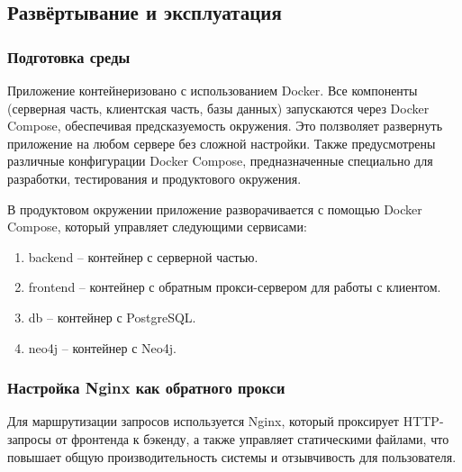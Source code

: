 


\subsection{Развёртывание и эксплуатация}

\subsubsection{Подготовка среды}

Приложение контейнеризовано с использованием Docker. Все компоненты (серверная часть, клиентская часть, базы данных) запускаются через Docker Compose, обеспечивая предсказуемость окружения. Это ползволяет развернуть приложение на любом сервере без сложной настройки. Также предусмотрены различные конфигурации Docker Compose, предназначенные специально для разработки, тестирования и продуктового окружения.

В продуктовом окружении приложение разворачивается с помощью Docker Compose, который управляет следующими сервисами:
\begin{enumerate}
    \item backend -- контейнер с серверной частью.
    \item frontend -- контейнер с обратным прокси-сервером для работы с клиентом.
    \item db -- контейнер с PostgreSQL.
    \item neo4j -- контейнер с Neo4j.
\end{enumerate}

\subsubsection{Настройка Nginx как обратного прокси}

Для маршрутизации запросов используется Nginx, который проксирует HTTP-запросы от фронтенда к бэкенду, а также управляет статическими файлами, что повышает общую производительность системы и отзывчивость для пользователя.


